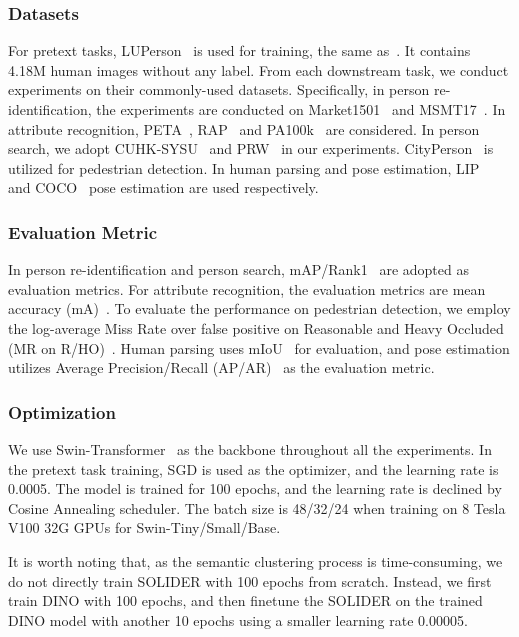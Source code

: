 \documentclass[10pt,twocolumn,letterpaper]{article}
\begin{document}
\subsubsection{Datasets} 
For pretext tasks, LUPerson~\cite{lup,fu2022large} is used for training, the same as~\cite{luo2021self,pass}. It contains 4.18M human images without any label. From each downstream task, we conduct experiments on their commonly-used datasets. 
Specifically, in person re-identification, the experiments are conducted on Market1501~\cite{market2015iccv} and MSMT17~\cite{msmt17}. 
In attribute recognition, PETA~\cite{attreval}, RAP~\cite{attreval} and PA100k~\cite{pa100k} are considered. 
In person search, we adopt CUHK-SYSU~\cite{cuhk-sysu} and PRW~\cite{prw} in our experiments. 
CityPerson~\cite{cityperson} is utilized for pedestrian detection. 
In human parsing and pose estimation, LIP~\cite{lip} and COCO~\cite{coco} pose estimation are used respectively. 

\subsubsection{Evaluation Metric} 
In person re-identification and person search, mAP/Rank1~\cite{market2015iccv} are adopted as evaluation metrics. 
For attribute recognition, the evaluation metrics are mean accuracy (mA)~\cite{attreval}. 
To evaluate the performance on pedestrian detection, we employ the log-average Miss Rate over false positive on Reasonable and Heavy Occluded (MR on R/HO)~\cite{pedestron}.
Human parsing uses mIoU~\cite{schp} for evaluation, and pose estimation utilizes Average Precision/Recall (AP/AR)~\cite{hrformer} as the evaluation metric.

\subsubsection{Optimization} 
We use Swin-Transformer~\cite{swin} as the backbone throughout all the experiments. 
In the pretext task training, 
SGD is used as the optimizer, and the learning rate is 0.0005. The model is trained for 100 epochs, and the learning rate is declined by Cosine Annealing scheduler. The batch size is 48/32/24 when training on  8 Tesla V100 32G GPUs for Swin-Tiny/Small/Base.

It is worth noting that, as the semantic clustering process is time-consuming, we do not directly train SOLIDER with 100 epochs from scratch. Instead, we first train DINO with 100 epochs, and then finetune the SOLIDER on the trained DINO model with another 10 epochs using a smaller learning rate 0.00005.
\end{document}
